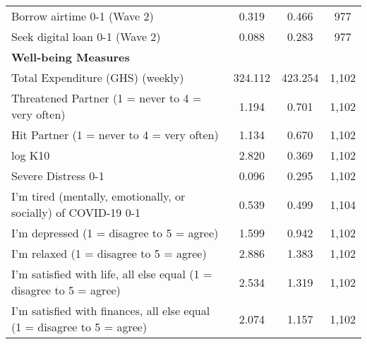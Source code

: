 \begin{tabular}{lccc}
Borrow airtime 0-1 (Wave 2) & 0.319 & 0.466 & 977 \\ 
Seek digital loan 0-1 (Wave 2) & 0.088 & 0.283 & 977 \\ 
\textbf{Well-being Measures} & & & \\ 
Total Expenditure (GHS) (weekly) & 324.112 & 423.254 & 1,102 \\ 
Threatened Partner (1 = never to 4 = very often) & 1.194 & 0.701 & 1,102 \\ 
Hit Partner (1 = never to 4 = very often) & 1.134 & 0.670 & 1,102 \\ 
log K10 & 2.820 & 0.369 & 1,102 \\ 
Severe Distress 0-1 & 0.096 & 0.295 & 1,102 \\ 
I'm tired (mentally, emotionally, or socially) of COVID-19 0-1 & 0.539 & 0.499 & 1,104 \\ 
I'm depressed (1 = disagree to 5 = agree) & 1.599 & 0.942 & 1,102 \\ 
I'm relaxed (1 = disagree to 5 = agree) & 2.886 & 1.383 & 1,102 \\ 
I'm satisfied with life, all else equal (1 = disagree to 5 = agree) & 2.534 & 1.319 & 1,102 \\ 
I'm satisfied with finances, all else equal (1 = disagree to 5 = agree) & 2.074 & 1.157 & 1,102 \\ 
\hline\hline
\end{tabular}
